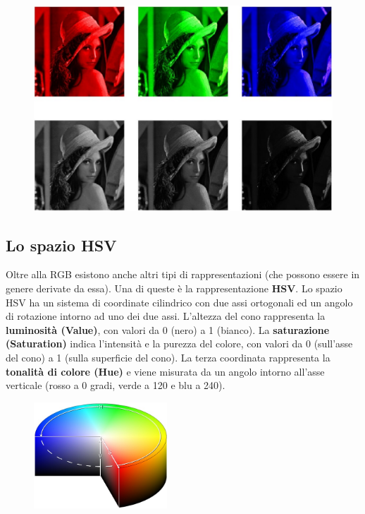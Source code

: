 \begin{figure}[H]
    \centering
    \includegraphics[width=12cm, keepaspectratio]{capitoli/immagini/imgs/canali_RGB_e_grigio.jpg}
\end{figure}

\subsection{Lo spazio HSV}

Oltre alla RGB esistono anche altri tipi di rappresentazioni (che
possono essere in genere derivate da essa).
Una di queste è la rappresentazione \textbf{HSV}. Lo spazio HSV ha un
sistema di coordinate cilindrico con due assi ortogonali ed un
angolo di rotazione intorno ad uno dei due assi.
L'altezza del cono rappresenta la \textbf{luminosità (Value)}, con valori da
0 (nero) a 1 (bianco). La \textbf{saturazione (Saturation)} indica l'intensità
e la purezza del colore, con valori da 0 (sull'asse del cono) a 1
(sulla superficie del cono). La terza coordinata rappresenta la
\textbf{tonalità di colore (Hue)} e viene misurata da un angolo intorno
all'asse verticale (rosso a 0 gradi, verde a 120 e blu a 240).

\begin{figure}[H]
    \centering
    \includegraphics[width=5cm, keepaspectratio]{capitoli/immagini/imgs/cilindro_hsv.jpg}
\end{figure}

